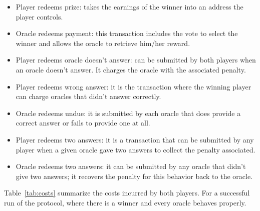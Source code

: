 \begin{itemize}
    \item Player redeems prize: takes the earnings of the winner into an address
        the player controls.
    \item Oracle redeems payment: this transaction includes the vote to select
        the winner and allows the oracle to retrieve him/her reward.
    \item Player redeems oracle doesn't answer: can be submitted by both players
        when an oracle doesn't answer. It charges the oracle with the associated
        penalty.
    \item Player redeems wrong answer: it is the transaction where the winning
        player can charge oracles that didn't answer correctly.
    \item Oracle redeems undue: it is submitted by each oracle that does provide
        a correct answer or fails to provide one at all.
    \item Player redeems two answers: it is a transaction that can be submitted
        by any player when a given oracle gave two answers to collect the
        penalty associated.
    \item Oracle redeems two answers: it can be submitted by any oracle that
        didn't give two answers; it recovers the penalty for this behavior back
        to the oracle.
\end{itemize}

Table~\ref{tab:costs}  summarize the costs incurred by both players.
For a successful run of the protocol, where there is a winner and every oracle
  behaves properly.


